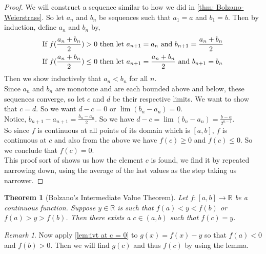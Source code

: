 \documentclass{article}
\newtheorem{theorem}{Theorem}[section]
\theoremstyle{definition}
\theoremstyle{remark}
\newtheorem{remark}{Remark}[section]
\begin{document}
\begin{proof}
We will construct a sequence similar to how we did in \ref{thm: Bolzano-Weierstrass}.
So let $a_n$ and $b_n$ be sequences such that $a_1 = a$ and $b_1 = b$. Then by induction, 
define $a_n$ and $b_n$ by,
\begin{align*}
& \textnormal{If } f(\frac{a_n + b_n}{2}) > 0 \textnormal{ then let } a_{n+1} = a_n \textnormal{ and } b_{n+1} = \frac{a_n + b_n}{2}\\
& \textnormal{If } f(\frac{a_n + b_n}{2}) \leq 0 \textnormal{ then let } a_{n+1} = \frac{a_n + b_n}{2} \textnormal{ and } b_{n+1} = b_n
\end{align*}
Then we show inductively that $a_n < b_n$ for all $n$.\\
Since $a_n$ and $b_n$ are monotone and are each bounded above and below, 
these sequences converge, so let $c$ and $d$ be their respective limits. We 
want to show that $c=d$. So we want $d-c = 0$ or $\lim(b_n - a_n) = 0$. \\
Notice, $b_{n+1} - a_{n+1} = \frac{b_n - a_n}{2}$. So we have $d-c = \lim(b_n - a_n) = \frac{b - a}{2^{n-1}}$.\\
So since $f$ is continuous at all points of its domain which is $[a,b]$, 
$f$ is continuous at $c$ and also from the above we have $f(c) \geq 0$ and $f(c) \leq 0$.
So we conclude that $f(c) = 0$. \\
This proof sort of shows us how the element $c$ is found, we find it by repeated
narrowing down, using the average of the last values as the step taking 
us narrower. 
\end{proof}

\vspace{.5cm}



\begin{theorem}[Bolzano's Intermediate Value Theorem]\label{lem:ivt}
Let $f : [a,b] \to \mathbb{R}$ be a continuous function. Suppose $y \in \mathbb{R}$ is such that $f(a) < y < f(b)$ or $f(a) > y > f(b)$. Then there exists a $c \in (a,b)$ such that $f(c) = y$.
\end{theorem}



\begin{remark}
Now apply \ref{lem:ivt at c = 0} to $g(x) = f(x) - y$ so that 
$f(a) < 0$ and $f(b) > 0$. Then we will find $g(c)$ and thus $f(c)$ by using the lemma.
\end{remark}

\vspace{.5cm}
\end{document}
